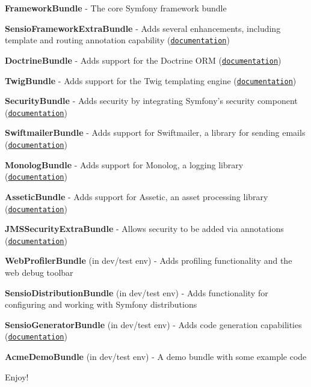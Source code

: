 \begin{DoxyItemize}
\item {\bfseries Framework\-Bundle} -\/ The core Symfony framework bundle
\item {\bfseries Sensio\-Framework\-Extra\-Bundle} -\/ Adds several enhancements, including template and routing annotation capability (\href{http://symfony.com/doc/current/bundles/SensioFrameworkExtraBundle/index.html}{\tt documentation})
\item {\bfseries Doctrine\-Bundle} -\/ Adds support for the Doctrine O\-R\-M (\href{http://symfony.com/doc/current/book/doctrine.html}{\tt documentation})
\item {\bfseries Twig\-Bundle} -\/ Adds support for the Twig templating engine (\href{http://symfony.com/doc/current/book/templating.html}{\tt documentation})
\item {\bfseries Security\-Bundle} -\/ Adds security by integrating Symfony's security component (\href{http://symfony.com/doc/current/book/security.html}{\tt documentation})
\item {\bfseries Swiftmailer\-Bundle} -\/ Adds support for Swiftmailer, a library for sending emails (\href{http://symfony.com/doc/2.0/cookbook/email.html}{\tt documentation})
\item {\bfseries Monolog\-Bundle} -\/ Adds support for Monolog, a logging library (\href{http://symfony.com/doc/2.0/cookbook/logging/monolog.html}{\tt documentation})
\item {\bfseries Assetic\-Bundle} -\/ Adds support for Assetic, an asset processing library (\href{http://symfony.com/doc/2.0/cookbook/assetic/asset_management.html}{\tt documentation})
\item {\bfseries J\-M\-S\-Security\-Extra\-Bundle} -\/ Allows security to be added via annotations (\href{http://symfony.com/doc/current/bundles/JMSSecurityExtraBundle/index.html}{\tt documentation})
\item {\bfseries Web\-Profiler\-Bundle} (in dev/test env) -\/ Adds profiling functionality and the web debug toolbar
\item {\bfseries Sensio\-Distribution\-Bundle} (in dev/test env) -\/ Adds functionality for configuring and working with Symfony distributions
\item {\bfseries Sensio\-Generator\-Bundle} (in dev/test env) -\/ Adds code generation capabilities (\href{http://symfony.com/doc/current/bundles/SensioGeneratorBundle/index.html}{\tt documentation})
\item {\bfseries Acme\-Demo\-Bundle} (in dev/test env) -\/ A demo bundle with some example code
\end{DoxyItemize}

Enjoy! 